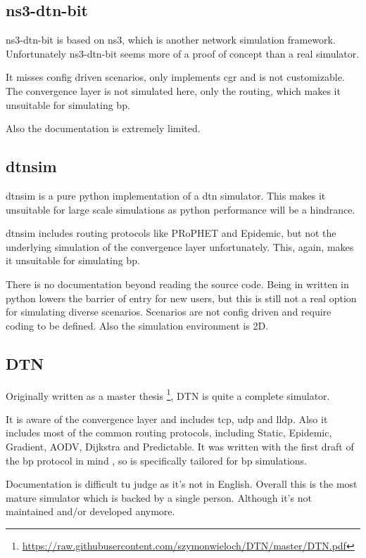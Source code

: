 \documentclass{tudscrartcl}
\newcommand{\dtn}{
  \ac{dtn}
}
\begin{document}
\subsection{ns3-dtn-bit}

ns3-dtn-bit is based on \ac{ns3}, which is another network simulation framework. Unfortunately ns3-dtn-bit seems more of a proof of concept than a real simulator.

It misses config driven scenarios, only implements \ac{cgr} and is not customizable. The convergence layer is not simulated here, only the routing, which makes it unsuitable for simulating \ac{bp}.

Also the documentation is extremely limited.

\subsection{dtnsim}

dtnsim is a pure python implementation of a \dtn simulator. This makes it unsuitable for large scale simulations as python performance will be a hindrance.

dtnsim includes routing protocols like PRoPHET and Epidemic, but not the underlying simulation of the convergence layer unfortunately. This, again, makes it unsuitable for simulating \ac{bp}.

There is no documentation beyond reading the source code. Being in written in python lowers the barrier of entry for new users, but this is still not a real option for simulating diverse scenarios.
Scenarios are not config driven and require coding to be defined.
Also the simulation environment is 2D.

\subsection{DTN}

Originally written as a master thesis \footnote{\url{https://raw.githubusercontent.com/szymonwieloch/DTN/master/DTN.pdf}}, DTN is quite a complete simulator.

It is aware of the convergence layer and includes \ac{tcp}, \ac{udp} and \ac{lldp}. Also it includes most of the common routing protocols, including Static, Epidemic, Gradient, AODV, Dijkstra and Predictable.
It was written with the first draft of the \ac{bp} protocol in mind \cite{RFC5050}, so is specifically tailored for \ac{bp} simulations.

Documentation is difficult tu judge as it's not in English. Overall this is the most mature simulator which is backed by a single person. Although it's not maintained and/or developed anymore.
\end{document}
